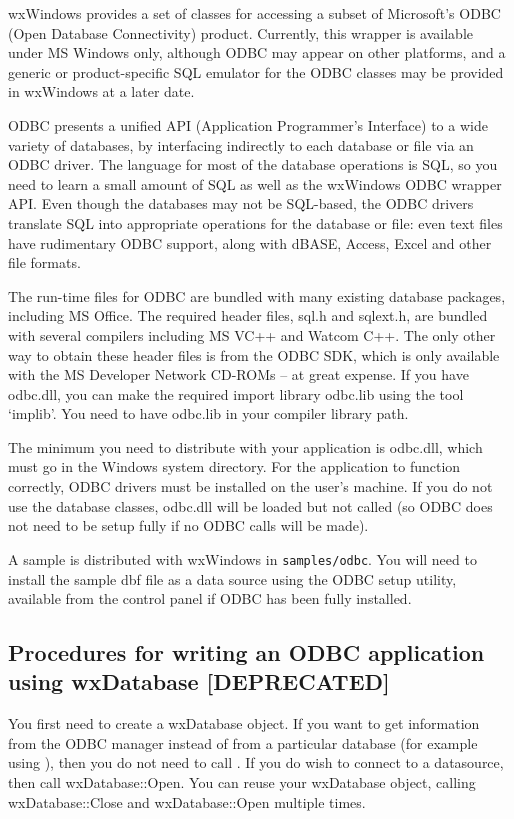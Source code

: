 wxWindows provides a set of classes for accessing a subset of Microsoft's ODBC (Open Database Connectivity)
product. Currently, this wrapper is available under MS Windows only, although
ODBC may appear on other platforms, and a generic or product-specific SQL emulator for the ODBC
classes may be provided in wxWindows at a later date.

ODBC presents a unified API (Application Programmer's Interface) to a
wide variety of databases, by interfacing indirectly to each database or
file via an ODBC driver. The language for most of the database
operations is SQL, so you need to learn a small amount of SQL as well as
the wxWindows ODBC wrapper API. Even though the databases may not be
SQL-based, the ODBC drivers translate SQL into appropriate operations
for the database or file: even text files have rudimentary ODBC support,
along with dBASE, Access, Excel and other file formats.

The run-time files for ODBC are bundled with many existing database
packages, including MS Office. The required header files, sql.h and
sqlext.h, are bundled with several compilers including MS VC++ and
Watcom C++. The only other way to obtain these header files is from the
ODBC SDK, which is only available with the MS Developer Network CD-ROMs
-- at great expense. If you have odbc.dll, you can make the required
import library odbc.lib using the tool `implib'. You need to have odbc.lib
in your compiler library path.

The minimum you need to distribute with your application is odbc.dll, which must
go in the Windows system directory. For the application to function correctly,
ODBC drivers must be installed on the user's machine. If you do not use the database
classes, odbc.dll will be loaded but not called (so ODBC does not need to be
setup fully if no ODBC calls will be made).

A sample is distributed with wxWindows in {\tt samples/odbc}. You will need to install
the sample dbf file as a data source using the ODBC setup utility, available from
the control panel if ODBC has been fully installed.

\subsection{Procedures for writing an ODBC application using wxDatabase [DEPRECATED]}

You first need to create a wxDatabase object. If you want to get information
from the ODBC manager instead of from a particular database (for example
using ), then you
do not need to call .
If you do wish to connect to a datasource, then call wxDatabase::Open.
You can reuse your wxDatabase object, calling wxDatabase::Close and wxDatabase::Open
multiple times.

